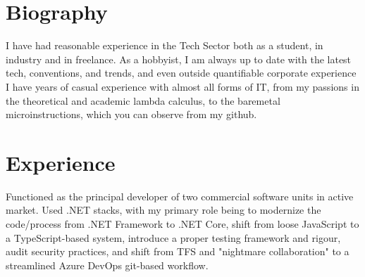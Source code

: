 \documentclass[a4paper]{cv}
\begin{document}
	\hfill
	\begin{minipage}[t]{0.6\textwidth} %
		
		\vspace{2em}
		\section{Biography}
		
		I have had reasonable experience in the Tech Sector both as a student, in industry and in freelance. As a hobbyist, I am always up to date with the latest tech, conventions, and trends, and even outside quantifiable corporate experience I have years of casual experience with almost all forms of IT, from my passions in the theoretical and academic lambda calculus, to the baremetal microinstructions, which you can observe from my github.
		
		\sectionspace
		
		
		\vspace{2em}
		\section{Experience}
		
		
		\vspace{\topsep} %
		\begin{tightitemize}
			\item\small Functioned as the principal developer of two commercial software units in active market. Used .NET stacks, with my primary role being to modernize the code/process from .NET Framework to .NET Core, shift from loose JavaScript to a TypeScript-based system, introduce a proper testing framework and rigour, audit security practices, and shift from TFS and "nightmare collaboration" to a streamlined Azure DevOps git-based workflow.
		\end{tightitemize}
		
		\sectionspace %
		

\end{minipage}
\end{document}

